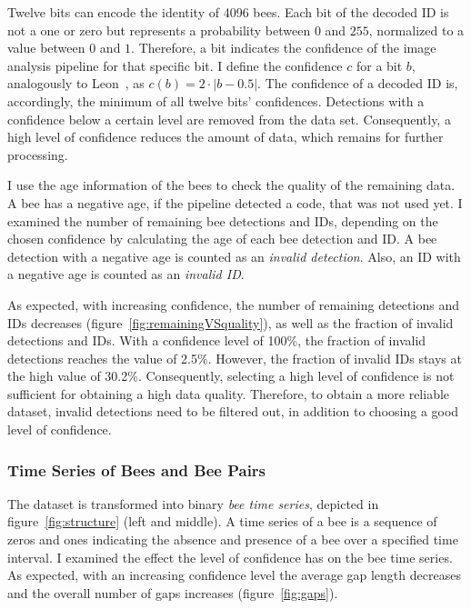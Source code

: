 
Twelve bits can encode the identity of 4096 bees.
Each bit of the decoded ID is not a one or zero but represents a probability between $0$ and $255$, normalized to a value between $0$ and $1$.
Therefore, a bit indicates the confidence of the image analysis pipeline for that specific bit.
I define the confidence $c$ for a bit $b$, analogously to Leon~\textcite[p.~14]{leon2016}, as $c(b)=2\cdot|b-0.5|$.
The confidence of a decoded ID is, accordingly, the minimum of all twelve bits' confidences.
Detections with a confidence below a certain level are removed from the data set.
Consequently, a high level of confidence reduces the amount of data, which remains for further processing.

I use the age information of the bees to check the quality of the remaining data.
A bee has a negative age, if the pipeline detected a code, that was not used yet.
I examined the number of remaining bee detections and IDs, depending on the chosen confidence by calculating the age of each bee detection and ID.
A bee detection with a negative age is counted as an \emph{invalid detection}. Also, an ID with a negative age is counted as an \emph{invalid ID}.

As expected, with increasing confidence, the number of remaining detections and IDs decreases (figure~\ref{fig:remainingVSquality}), as well as the fraction of invalid detections and IDs.
With a confidence level of 100\%, the fraction of invalid detections reaches the value of 2.5\%. However, the fraction of invalid IDs stays at the high value of 30.2\%. Consequently, selecting a high level of confidence is not sufficient for obtaining a high data quality.
Therefore, to obtain a more reliable dataset, invalid detections need to be filtered out, in addition to choosing a good level of confidence.

\subsubsection{Time Series of Bees and Bee Pairs}
\label{subsec:tracking}

The dataset is transformed into binary \emph{bee time series}, depicted in figure~\ref{fig:structure} (left and middle). A time series of a bee is a sequence of zeros and ones indicating the absence and presence of a bee over a specified time interval.
I examined the effect the level of confidence has on the bee time series.
As expected, with an increasing confidence level the average gap length decreases and the overall number of gaps increases (figure~\ref{fig:gaps}).

